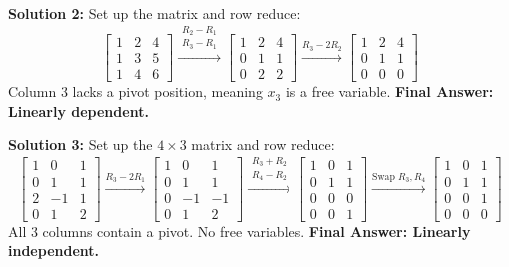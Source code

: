 \documentclass[12pt]{article}
\begin{document}
\textbf{Solution 2:} Set up the matrix and row reduce:
$$ \begin{bmatrix} 1 & 2 & 4 \\ 1 & 3 & 5 \\ 1 & 4 & 6 \end{bmatrix} \xrightarrow{\substack{R_2 - R_1 \\ R_3 - R_1}} \begin{bmatrix} 1 & 2 & 4 \\ 0 & 1 & 1 \\ 0 & 2 & 2 \end{bmatrix} \xrightarrow{R_3 - 2R_2} \begin{bmatrix} 1 & 2 & 4 \\ 0 & 1 & 1 \\ 0 & 0 & 0 \end{bmatrix} $$
Column 3 lacks a pivot position, meaning $x_3$ is a free variable. \textbf{Final Answer: Linearly dependent.}

\textbf{Solution 3:} Set up the $4 \times 3$ matrix and row reduce:
$$ \begin{bmatrix} 1 & 0 & 1 \\ 0 & 1 & 1 \\ 2 & -1 & 1 \\ 0 & 1 & 2 \end{bmatrix} \xrightarrow{R_3 - 2R_1} \begin{bmatrix} 1 & 0 & 1 \\ 0 & 1 & 1 \\ 0 & -1 & -1 \\ 0 & 1 & 2 \end{bmatrix} \xrightarrow{\substack{R_3 + R_2 \\ R_4 - R_2}} \begin{bmatrix} 1 & 0 & 1 \\ 0 & 1 & 1 \\ 0 & 0 & 0 \\ 0 & 0 & 1 \end{bmatrix} \xrightarrow{\text{Swap } R_3, R_4} \begin{bmatrix} 1 & 0 & 1 \\ 0 & 1 & 1 \\ 0 & 0 & 1 \\ 0 & 0 & 0 \end{bmatrix} $$
All 3 columns contain a pivot. No free variables. \textbf{Final Answer: Linearly independent.}
\end{document}
